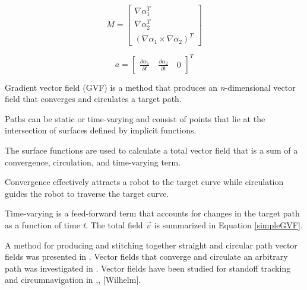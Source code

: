 \documentclass[conf]{new-aiaa}
\begin{document}
\begin{equation}
\label{mMatrix}
M =\begin{bmatrix}
\nabla\alpha_1^T \\
\nabla\alpha_2^T \\
(\nabla\alpha_1 \times \nabla\alpha_2)^T
\end{bmatrix}
\end{equation}

\begin{equation}
\label{aVector}
a =\begin{bmatrix}
\frac{\partial \alpha_1}{\partial t} \quad   \frac{\partial \alpha_2}{\partial t} \quad   0
\end{bmatrix}^T
\end{equation}


Gradient vector field (GVF) is a method that produces an \textit{n}-dimensional vector field that converges and circulates a target path\cite{goncalves_artificial_2009}.

 Paths can be static or time-varying and consist of points that lie at the intersection of surfaces defined by implicit functions. 
 
 The surface functions are used to calculate a total vector field that is a sum of a convergence, circulation, and time-varying term.
 
  Convergence effectively attracts a robot to the target curve while circulation guides the robot to traverse the target curve. 
  
  Time-varying is a feed-forward term that accounts for changes in the target path as a function of time \textit{t}. The total field $\vec{v}$ is summarized in Equation \ref{simpleGVF}.







A method for producing and stitching together straight and circular path vector fields was presented in \cite{nelson_cooperative_2005}. Vector fields that converge and circulate an arbitrary path was investigated in \cite{griffiths_vector_2006}. Vector fields have been studied for standoff tracking  and circumnavigation in \cite{frew_cooperative_2007},\cite{miao_orthogonal_2016}, [Wilhelm]. \\
\end{document}

